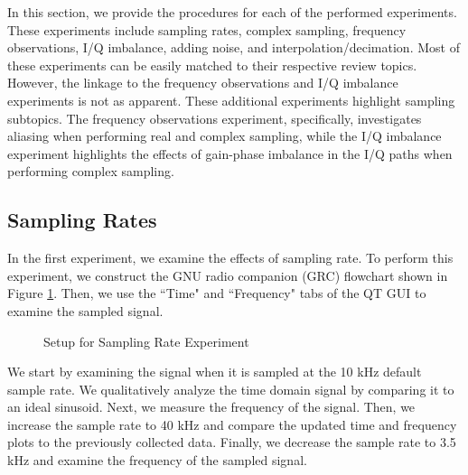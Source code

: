 \documentclass{article}
\begin{document}
In this section, we provide the procedures for each of the performed experiments. These experiments include sampling rates, complex sampling, frequency observations, I/Q imbalance, adding noise, and interpolation/decimation. Most of these experiments can be easily matched to their respective review topics. However, the linkage to the frequency observations and I/Q imbalance experiments is not as apparent. These additional experiments highlight sampling subtopics. The frequency observations experiment, specifically, investigates aliasing when performing real and complex sampling, while the I/Q imbalance experiment highlights the effects of gain-phase imbalance in the I/Q paths when performing complex sampling.

\subsection{Sampling Rates \label{subsection::sampling_rates}}

In the first experiment, we examine the effects of sampling rate. To perform this experiment, we construct the GNU radio companion (GRC) flowchart shown in Figure \ref{fig::sampling_rates_experiment}. Then, we use the ``Time" and ``Frequency" tabs of the QT GUI to examine the sampled signal.

\begin{figure}[H]
	\centerline{}
	\caption{Setup for Sampling Rate Experiment}
	\label{fig::sampling_rates_experiment}
\end{figure}

We start by examining the signal when it is sampled at the 10 kHz default sample rate. We qualitatively analyze the time domain signal by comparing it to an ideal sinusoid. Next, we measure the frequency of the signal. Then, we increase the sample rate to 40 kHz and compare the updated time and frequency plots to the previously collected data. Finally, we decrease the sample rate to 3.5 kHz and examine the frequency of the sampled signal.
\end{document}
